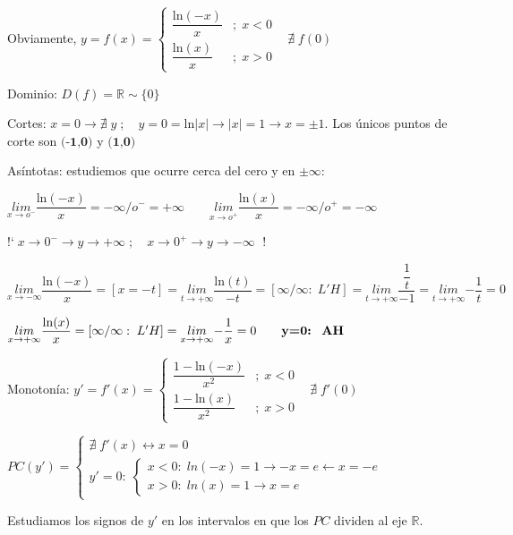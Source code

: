 \begin{proofw}\renewcommand{\qedsymbol}{$\diamond$}	

Obviamente, $y=f(x)=\begin{cases}
					\dfrac {\mathrm{ln}(-x)}{x} &; \; x<0 \\
					\dfrac {\mathrm{ln}(x)}{x} &; \; x>0 
					\end{cases}\; \; \;  \nexists \;  f(0)$
					
Dominio: $D(f)=\mathbb R \sim \{0\}$

Cortes: $x=0 \to \nexists \; y\; ; \quad y=0=\mathrm{ln}|x| \to |x|=1 \to x=\pm 1$. Los únicos puntos de corte son $\textbf{(-1,0)}$ y  $\textbf{(1,0)}$

Asíntotas: estudiemos que ocurre cerca del cero y en $\pm \infty$:

$\underset {x\to o^-}{lim}{\dfrac {\mathrm{ln}(-x)}{x}} = -\infty/o^-=+\infty \qquad \underset {x\to o^+}{lim}{\dfrac {\mathrm{ln}(x)}{x}} = -\infty/o^+=-\infty \quad $ 


!`$ \; x \to 0^- \rightarrow y\to +\infty \; ; \quad  x \to 0^+ \rightarrow y \to -\infty \; $ !

$\underset {x\to -\infty}{lim}{\dfrac {\mathrm{ln}(-x)}{x}} = [x=-t] = \underset {t\to +\infty}{lim}{\dfrac {\mathrm{ln}(t)}{-t}}= [\infty / \infty: 	\; L'H]=\underset {t\to +\infty}{lim}{\dfrac {\dfrac 1 t}{-1}} =\underset {t\to +\infty}{lim}{ -\dfrac 1 t }=0$

$\underset {x\to +\infty}{lim}{\dfrac {\mathrm{ln}(x)}{x}} = [\infty / \infty: 	\; L'H]= \underset {x\to +\infty}{lim}{ -\dfrac 1 x }=0 \qquad \textbf{y=0:\; AH}$

Monotonía:   $y'=f'(x)=\begin{cases}
					\dfrac{1-\mathrm{ln}(-x)}{x^2} &; \; x<0 \\
					\dfrac{1-\mathrm{ln}(x)}{x^2} &; \; x >0 
					\end{cases}\; \; \;  \nexists \;  f'(0)$
					
$PC(y')=\begin{cases}
\nexists \;  f'(x) \leftrightarrow x=0 \\
y'=0: \; \begin{cases}
 			x<0: \; ln(-x)=1 \to -x=e \leftarrow x=-e\\
 			x>0: \; ln(x)=1 \to x=e 
 			\end{cases}	
\end{cases}$

Estudiamos los signos de $y'$ en los intervalos en que los $PC$ dividen al eje $\mathbb R$.


\end{proofw}
